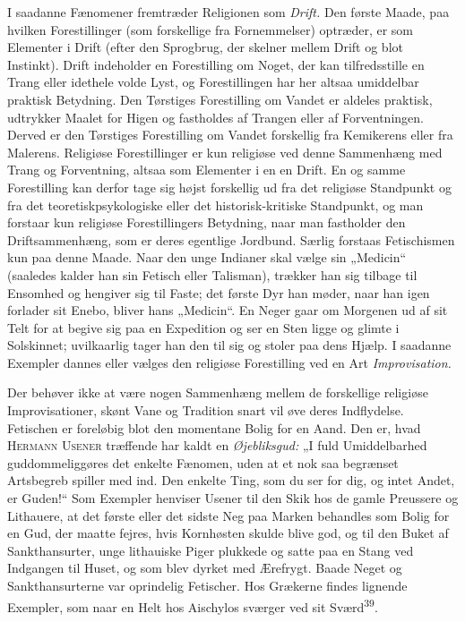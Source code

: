 \documentclass[12pt,a4paper,openany]{book}
\newcommand{\opage}[1]{\marginnote{\footnotesize\textit{[#1]}}}
\begin{document}
I saadanne Fænomener fremtræder Religionen som \textit{Drift.} Den
første Maade, paa hvilken Forestillinger (som forskellige fra
Fornemmelser) optræder, er som Elementer i Drift (efter den Sprogbrug,
der skelner mellem Drift og blot Instinkt). Drift indeholder en
Forestilling om Noget, der kan tilfredsstille en Trang eller idethele
volde Lyst, og Forestillingen har her altsaa umiddelbar praktisk
Betydning. Den Tørstiges Forestilling om Vandet er aldeles praktisk,
udtrykker Maalet for Higen og fastholdes af Trangen eller af
Forventningen. Derved er den Tørstiges Forestilling om Vandet forskellig
fra Kemikerens eller fra Malerens. Religiøse Forestillinger er kun
religiøse ved denne Sammenhæng med Trang og Forventning, altsaa som
Elementer i en en Drift. En og samme Forestilling kan derfor tage sig
højst forskellig ud fra det religiøse Standpunkt og fra det
teoretiskpsykologiske eller det historisk-kritiske Standpunkt, og man
forstaar kun religiøse Forestillingers Betydning, naar man fastholder
den Driftsammenhæng, som er deres egentlige Jordbund. Særlig forstaas
Fetischismen kun paa denne Maade. Naar den unge Indianer skal vælge sin
„Medicin“ (saaledes kalder han sin Fetisch eller Talisman), trækker han
sig tilbage til Ensomhed og hengiver sig til Faste; det første Dyr han
møder, naar han igen forlader sit Enebo, bliver hans „Medicin“. En Neger
gaar om Morgenen ud af sit Telt for at begive sig paa en Expedition og
ser en Sten ligge og glimte i Solskinnet; uvilkaarlig tager han den
\opage{90}til sig og stoler paa dens Hjælp. I saadanne Exempler dannes
eller vælges den religiøse Forestilling ved en Art
\textit{Improvisation.}

Der behøver ikke at være nogen Sammenhæng mellem de forskellige
religiøse Improvisationer, skønt Vane og Tradition snart vil øve deres
Indflydelse. Fetischen er foreløbig blot den momentane Bolig for en
Aand. Den er, hvad \textsc{Hermann Usener} træffende har kaldt en
\textit{Øjebliksgud:} „I fuld Umiddelbarhed guddommeliggøres det enkelte
Fænomen, uden at et nok saa begrænset Artsbegreb spiller med ind. Den
enkelte Ting, som du ser for dig, og intet Andet, er Guden!“ Som
Exempler henviser Usener til den Skik hos de gamle Preussere og
Lithauere, at det første eller det sidste Neg paa Marken behandles som
Bolig for en Gud, der maatte fejres, hvis Kornhøsten skulde blive god,
og til den Buket af Sankthansurter, unge lithauiske Piger plukkede og
satte paa en Stang ved Indgangen til Huset, og som blev dyrket med
Ærefrygt. Baade Neget og Sankthansurterne var oprindelig Fetischer. Hos
Grækerne findes lignende Exempler, som naar en Helt hos Aischylos
sværger ved sit Sværd\textsuperscript{39}.
\end{document}
